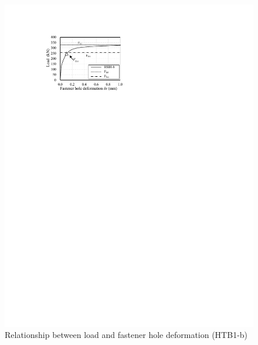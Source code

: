 \begin{figure}[htbp]
\begin{minipage}[t]{0.48\textwidth}
    \includegraphics{imgs/ch4/lfhd-ch4.pdf}
    \caption{Relationship between load and fastener hole deformation (HTB1-b)}
    \label{fig-lfhd-ch4}
    \end{minipage}
    \begin{minipage}[t]{0.48\textwidth}

\end{minipage}
\end{figure}
